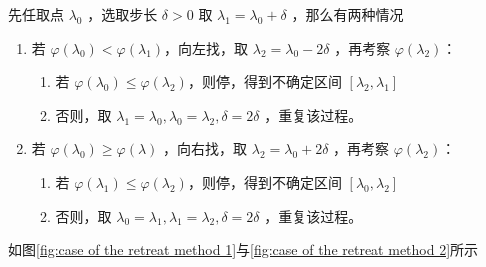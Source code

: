 \documentclass{book}
\begin{document}
先任取点 $\lambda_0$ ，选取步长 $\delta >0$ 取 $\lambda_1=\lambda_0+\delta$ ，那么有两种情况
\begin{enumerate}
    \item 若 $\varphi(\lambda_0)<\varphi(\lambda_1)$，向左找，取 $\lambda_2=\lambda_0-2\delta$ ，再考察 $\varphi(\lambda_2)$：
          \begin{enumerate}
              \item 若 $\varphi(\lambda_0)\le\varphi(\lambda_2)$，则停，得到不确定区间 $[\lambda_2,\lambda_1]$
              \item 否则，取 $\lambda_1=\lambda_0,\lambda_0=\lambda_2,\delta=2\delta$ ，重复该过程。
          \end{enumerate}
    \item 若 $\varphi(\lambda_0)\ge\varphi(\lambda)$ ，向右找，取 $\lambda_2=\lambda_0+2\delta$ ，再考察 $\varphi(\lambda_2)$：
          \begin{enumerate}
              \item 若 $\varphi(\lambda_1)\le\varphi(\lambda_2)$，则停，得到不确定区间 $[\lambda_0,\lambda_2]$
              \item 否则，取 $\lambda_0=\lambda_1,\lambda_1=\lambda_2,\delta=2\delta$ ，重复该过程。
          \end{enumerate}
\end{enumerate}

如图\ref{fig:case of the retreat method 1}与\ref{fig:case of the retreat method 2}所示
\end{document}
